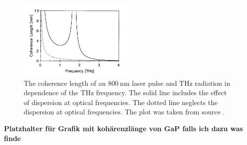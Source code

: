 \begin{figure}
    \centering
    \includegraphics[width=0.5\textwidth]{refferenced_pic/coherence_length_ZnTe.png}
    \caption{The coherence length of an $\SI{800}{\nano\meter}$ laser pulse and $\si{\tera\hertz}$ radiation in dependence of the $\si{\tera\hertz}$ frequency.
    The solid line includes the effect of dispersion at optical frequencies. The dotted line neglects the dispersion at optical frequencies.
    The plot was taken from source \cite{coherence_legnth}.}
    \label{fig:coherence_legnth}
\end{figure}
\textbf{Platzhalter für Grafik mit kohärenzlänge von GaP falls ich dazu was finde}
\FloatBarrier
